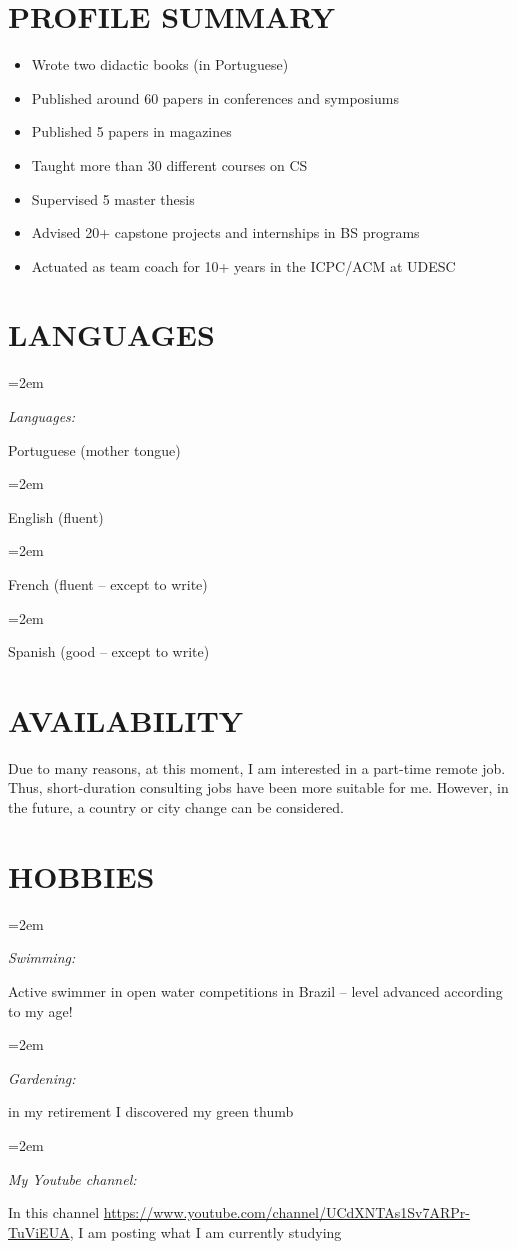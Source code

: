 \documentclass[paper=a4,fontsize=11pt]{scrartcl} %
\newlength{\spacebox}
\newcommand{\sepspace}{\vspace*{0.8em}}		%
\newcommand{\NewPart}[1]{\section*{\uppercase{#1}}}
\newcommand{\PersonalEntry}[2]{
		\noindent\hangindent=2em\hangafter=0 %
		\parbox{\spacebox}{        %
		\textit{#1}}		       %
		\hspace{1.5em} #2 \par}    %
\newcommand{\SkillsEntry}[2]{      %
		\noindent\hangindent=2em\hangafter=0 %
		\parbox{\spacebox}{        %
		\textit{#1}}			   %
		\hspace{1.5em} #2 \par}    %
\begin{document}
\NewPart{Profile Summary}{} %

\begin{itemize}
\setlength\itemsep{-2mm}
\item Wrote two didactic books  (in Portuguese)
\item Published around 60 papers in conferences and symposiums
\item Published 5 papers in magazines
\item Taught more than 30 different courses on CS 
\item Supervised 5 master thesis 
\item Advised  20+ capstone projects and internships in BS programs
\item Actuated as team coach for 10+ years in the ICPC/ACM at UDESC

\end{itemize}
\begin{comment}
\NewPart{Not my Cup of the Tea}{}

\begin{itemize}
\setlength\itemsep{-2mm}
\item Web developer
\item Front-end developer
\item Data-bank expert

\end{itemize}
\end{comment}

\NewPart{Languages}{}

\SkillsEntry{Languages:} {Portuguese (mother tongue)}
\SkillsEntry{}{English (fluent)}
\SkillsEntry{}{French (fluent -- except to write)}
\SkillsEntry{}{Spanish (good -- except to write)}


\NewPart{Availability}{}

Due to many reasons, at this moment, I am interested in a part-time remote job. Thus,  short-duration consulting jobs  have been more suitable for me. However, in the future, a country or city change can be considered.

\NewPart{Hobbies}{}

\SkillsEntry{Swimming:}{Active swimmer in open water competitions in Brazil -- level advanced according to my age!}
\sepspace

\SkillsEntry{Gardening:}{in my retirement I discovered my green thumb}
\sepspace

\SkillsEntry{My Youtube channel:} 
{In this channel 
  \url{https://www.youtube.com/channel/UCdXNTAs1Sv7ARPr-TuViEUA},
 I am posting what I am currently studying}
\end{document}
